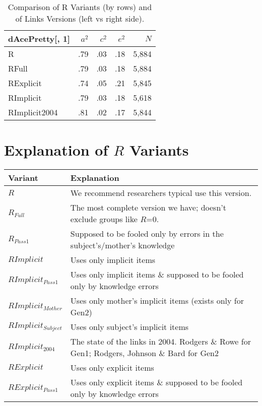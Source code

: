 \documentclass{article}\usepackage[]{graphicx}\usepackage[]{color}
\begin{document}
\begin{table}[ht]
\centering
{\large
\begin{tabular}{l|rrrr}
  \hline
dAcePretty[, 1] & $a^2$ & $c^2$ & $e^2$ & $N$ \\ 
  \hline
R & .79 & .03 & .18 & 5,884 \\ 
  RFull & .79 & .03 & .18 & 5,884 \\ 
  RExplicit & .74 & .05 & .21 & 5,845 \\ 
  RImplicit & .79 & .03 & .18 & 5,618 \\ 
  RImplicit2004 & .81 & .02 & .17 & 5,844 \\ 
   \hline
\end{tabular}
}
\caption{Comparison of R Variants (by rows) and of Links Versions (left vs right side).} 
\end{table}


\section{Explanation of $R$ Variants}
\begin{tabular}{l l}
\textbf{Variant} & \textbf{Explanation} \\
\hline
$R$ & We recommend researchers typical use this version. \\
$R_{Full}$ & The most complete version we have; doesn't exclude groups like $R$=0. \\
$R_{Pass1}$ & Supposed to be fooled only by errors in the subject's/mother's knowledge \\
\hline
$RImplicit$ & Uses only implicit items \\
$RImplicit_{Pass1}$ & Uses only implicit items \& supposed to be fooled only by knowledge errors \\
$RImplicit_{Mother}$ & Uses only mother's implicit items (exists only for Gen2)\\
$RImplicit_{Subject}$ & Uses only subject's implicit items\\
$RImplicit_{2004}$ & The state of the links in 2004.  Rodgers \& Rowe for Gen1; Rodgers, Johnson \& Bard for Gen2 \\
\hline
$RExplicit$ & Uses only explicit items \\
$RExplicit_{Pass1}$ & Uses only explicit items \& supposed to be fooled only by knowledge errors \\

\hline
\end{tabular}
\end{document}
